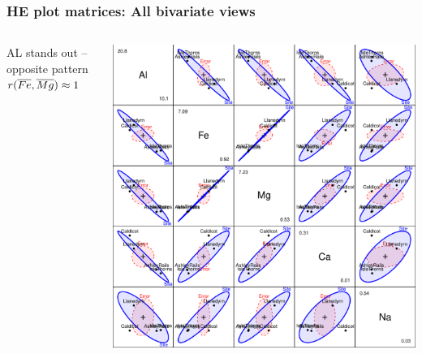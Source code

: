 \begin{frame}
	\frametitle{HE plot matrices: All bivariate views}
  \begin{columns}[c]
    \begin{column}{.25\textwidth}
	  AL stands out -- opposite pattern
    \vspace{3ex}
	  $r(\overline{Fe}, \overline{Mg}) \approx 1$

    \end{column}
    \begin{column}{.75\textwidth}
		\begin{center}
	      \includegraphics[height=.75\textheight,clip]{figures/pottery-HE3}
		  \\
		\end{center}
    \end{column}
  \end{columns}
\end{frame}

